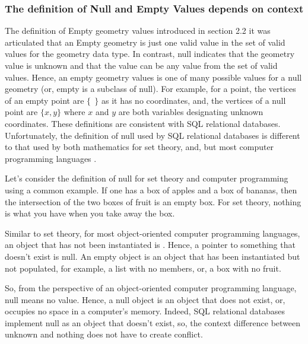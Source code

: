 \documentclass[letterpaper,11pt,english]{sphinxmanual}
\begin{document}
\subsubsection{The definition of Null and Empty Values depends on context}
\label{\detokenize{concept:the-definition-of-null-and-empty-values-depends-on-context}}
The definition of Empty geometry values introduced in section 2.2 it was articulated that an Empty geometry is just one valid value in the set of valid values for the geometry data type.  In contrast, null indicates that the geometry value is unknown and that the value can be any value from the set of valid values. Hence, an empty geometry values is one of many possible values for a null geometry (or, empty is a subclass of null).  For example, for a point, the vertices of an empty point are \(\{\ \ \}\) as it has no coordinates, and, the vertices of a null point are \(\{x,y\}\) where \(x\) and \(y\) are both variables designating unknown coordinates. These definitions are consistent with SQL relational databases.  Unfortunately, the definition of null used by SQL relational databases is different to that used by both mathematics for set theory, and, but most computer programming languages .

Let’s consider the definition of null for set theory and computer programming using a common example.  If one has a box of apples and a box of bananas, then the intersection of the two boxes of fruit is an empty box. For set theory,  \textendash{} nothing is what you have when you take away the box.

Similar to set theory, for most object-oriented computer programming languages, an object that has not been instantiated is .  Hence, a pointer to something that doesn’t exist is null. An empty object is an object that has been instantiated but not populated, for example, a list with no members, or, a box with no fruit.

So, from the perspective of an object-oriented computer programming language, null means no value.  Hence, a null object is an object that does not exist, or, occupies no space in a computer’s memory.  Indeed, SQL relational databases implement null as an object that doesn’t exist, so, the context difference between unknown and nothing does not have to create conflict.
\end{document}
